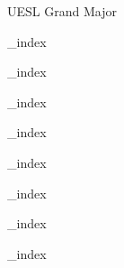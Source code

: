 \documentclass[a4paper,12pt]{article}
\begin{document}


\begin{center}

\huge{UESL Grand Major}

\end{center}



{_index}


{_index}


{_index}


{_index}


{_index}


{_index}


{_index}


{_index}
\end{document}
